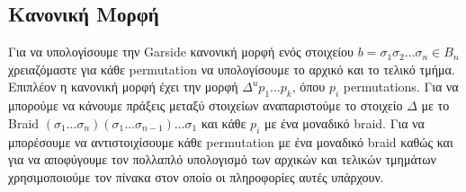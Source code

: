 \begin{comment}
\documentclass[a4paper,11pt]{article}
\usepackage{a4wide}
\usepackage{amsmath}
\usepackage{listings}
\usepackage{xgreek}
\usepackage{color}
\RequirePackage[cm-default]{fontspec}
\defaultfontfeatures{Mapping=tex-text}
\setmainfont{Ubuntu}
\setsansfont[Scale=MatchLowercase]{FreeMono}
\setmonofont[Scale=MatchLowercase]{Liberation Mono}
\newcommand\ntext[1]{\ensuremath{\mathsf{#1}}}
\lstset{language=Matlab,
        numbers=left, numberstyle=\tiny,
        basicstyle=\ttfamily\footnotesize,
        keywordstyle=\bfseries,
        xleftmargin=10pt,
        showspaces=false,
        breaklines,
        showstringspaces=false,
        breakatwhitespace=true,
        captionpos=b,
        breakindent=34.25ex,
        belowskip=5pt,
        escapeinside={@}{@}
        }



\end{comment}
\subsection{Κανονική Μορφή}

Για να υπολογίσουμε την Garside κανονική μορφή ενός στοιχείου $ b=\sigma_1\sigma_2\dots \sigma_n \in B_n$
χρειαζόμαστε για κάθε permutation να υπολογίσουμε το αρχικό και το τελικό τμήμα.
Επιπλέον η κανονική μορφή έχει την μορφή $\Delta^{u}p_1\dots p_k$, όπου $ p_i $ permutations. Για να μπορούμε να κάνουμε πράξεις μεταξύ στοιχείων αναπαριστούμε το στοιχείο $ \Delta$ με 
το Braid $ (\sigma_1\dots \sigma_n)(\sigma_1\dots \sigma_{n-1}) \dots \sigma_1 $ και κάθε $ p_i $ με ένα μοναδικό braid. 
Για να μπορέσουμε να αντιστοιχίσουμε κάθε permutation με ένα μοναδικό braid καθώς και για να αποφύγουμε τον πολλαπλό υπολογισμό των αρχικών και τελικών τμημάτων χρησιμοποιούμε τον πίνακα  στον οποίο οι πληροφορίες αυτές υπάρχουν.


